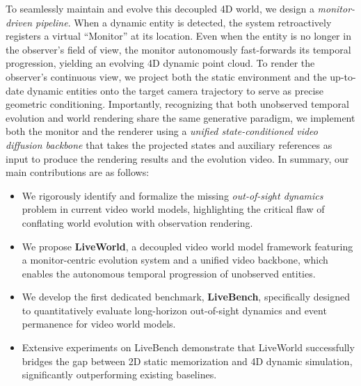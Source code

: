 To seamlessly maintain and evolve this decoupled 4D world, we design a \textit{monitor-driven pipeline}. When a dynamic entity is detected, the system retroactively registers a virtual ``Monitor'' at its location. Even when the entity is no longer in the observer's field of view, the monitor autonomously fast-forwards its temporal progression, yielding an evolving 4D dynamic point cloud. To render the observer's continuous view, we project both the static environment and the up-to-date dynamic entities onto the target camera trajectory to serve as precise geometric conditioning. Importantly, recognizing that both unobserved temporal evolution and world rendering share the same generative paradigm, we implement both the monitor and the renderer using a \textit{unified state-conditioned video diffusion backbone} that takes the projected states and auxiliary references as input to produce the rendering results and the evolution video. In summary, our main contributions are as follows:

\begin{itemize}
    \item We rigorously identify and formalize the missing \textit{out-of-sight dynamics} problem in current video world models, highlighting the critical flaw of conflating world evolution with observation rendering.
    \item We propose \textbf{LiveWorld}, a decoupled video world model framework featuring a monitor-centric evolution system and a unified video backbone, which enables the autonomous temporal progression of unobserved entities.
    \item We develop the first dedicated benchmark, \textbf{LiveBench}, specifically designed to quantitatively evaluate long-horizon out-of-sight dynamics and event permanence for video world models.
    \item Extensive experiments on LiveBench demonstrate that LiveWorld successfully bridges the gap between 2D static memorization and 4D dynamic simulation, significantly outperforming existing baselines.
\end{itemize}